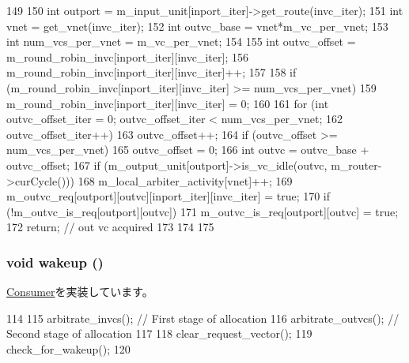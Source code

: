 \begin{DoxyCode}
149 {
150     int outport = m_input_unit[inport_iter]->get_route(invc_iter);
151     int vnet = get_vnet(invc_iter);
152     int outvc_base = vnet*m_vc_per_vnet;
153     int num_vcs_per_vnet = m_vc_per_vnet;
154 
155     int outvc_offset = m_round_robin_invc[inport_iter][invc_iter];
156     m_round_robin_invc[inport_iter][invc_iter]++;
157 
158     if (m_round_robin_invc[inport_iter][invc_iter] >= num_vcs_per_vnet)
159         m_round_robin_invc[inport_iter][invc_iter] = 0;
160 
161     for (int outvc_offset_iter = 0; outvc_offset_iter < num_vcs_per_vnet;
162             outvc_offset_iter++) {
163         outvc_offset++;
164         if (outvc_offset >= num_vcs_per_vnet)
165             outvc_offset = 0;
166         int outvc = outvc_base + outvc_offset;
167         if (m_output_unit[outport]->is_vc_idle(outvc, m_router->curCycle())) {
168             m_local_arbiter_activity[vnet]++;
169             m_outvc_req[outport][outvc][inport_iter][invc_iter] = true;
170             if (!m_outvc_is_req[outport][outvc])
171                 m_outvc_is_req[outport][outvc] = true;
172             return; // out vc acquired
173         }
174     }
175 }
\end{DoxyCode}
\hypertarget{classVCallocator__d_ae674290a26ecbd622c5160e38e8a4fe9}{
\subsubsection[{wakeup}]{\setlength{\rightskip}{0pt plus 5cm}void wakeup ()}}
\label{classVCallocator__d_ae674290a26ecbd622c5160e38e8a4fe9}


\hyperlink{classConsumer_a623e3e7d1b1c725d70009f7b01a421b9}{Consumer}を実装しています。


\begin{DoxyCode}
114 {
115     arbitrate_invcs(); // First stage of allocation
116     arbitrate_outvcs(); // Second stage of allocation
117 
118     clear_request_vector();
119     check_for_wakeup();
120 }
\end{DoxyCode}


